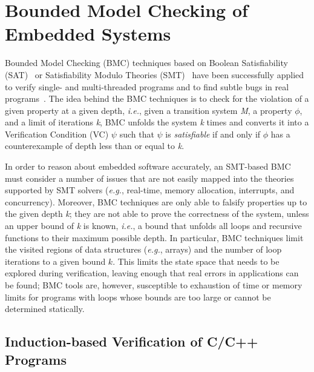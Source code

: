 \documentclass{acm_sen_article}
\begin{document}
\section{Bounded Model Checking of Embedded Systems}

Bounded Model Checking (BMC) techniques based on Boolean Satisfiability (SAT)~\cite{handbook09} or Satisfiability Modulo Theories (SMT)~\cite{BarrettSST09} have been successfully applied to verify single- and multi-threaded programs and to find subtle bugs in real programs~\cite{Clarke04,MerzFS12,CordeiroF11,Ivancic05,Cordeiro12}. The idea behind the BMC techniques is to check for the violation of a given property at a given depth, {\it i.e.}, given a transition system \textit{M}, a property $ \phi $, and a limit of iterations \textit{k}, BMC unfolds the system \textit{k} times and converts it into a Verification Condition (VC) $ \psi $ such that $\psi$ is \textit{satisfiable} if and only if $\phi$ has a counterexample of depth
less than or equal to \textit{k}.

In order to reason about embedded software accurately, an SMT-based BMC must consider a number of issues that are not easily mapped into the theories supported by SMT solvers ({\it e.g.}, real-time, memory allocation, interrupts, and concurrency). Moreover, BMC techniques are only able to falsify properties up to the given depth \textit{k}; they are not able to prove the correctness of the system, unless an upper bound of \textit{k} is known, {\it i.e.}, a bound that unfolds all loops and recursive functions to their maximum possible depth. In particular, BMC techniques limit the visited regions of data structures ({\it e.g.}, arrays) and the number of loop iterations to a given bound $k$. This limits the state space that needs to be explored during verification, leaving enough that real errors in applications \cite{Clarke04,MerzFS12,Ivancic05,Cordeiro12} can be found; BMC tools are, however, susceptible to exhaustion of time or memory limits for programs with loops whose bounds are too large or cannot be determined statically.  

\subsection{Induction-based Verification of C/C++ Programs}
\end{document}
